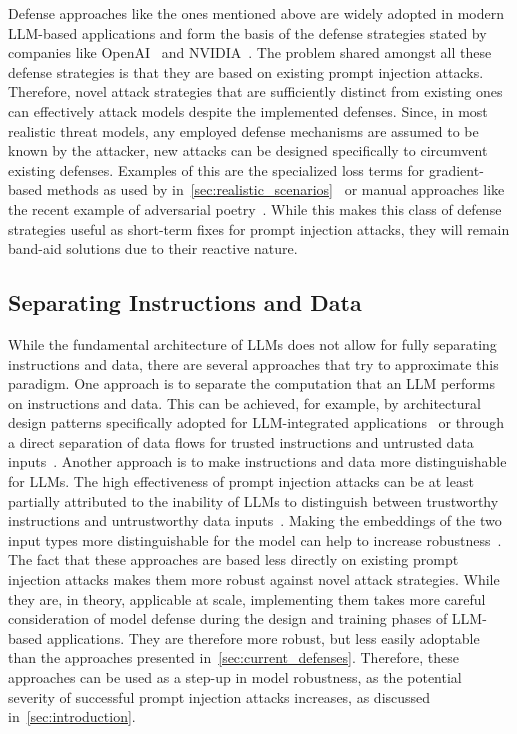 Defense approaches like the ones mentioned above are widely adopted in modern LLM-based applications and form the basis of the defense strategies stated by companies like OpenAI~\cite{openai_understanding_nodate} and NVIDIA~\cite{atefehasayesh_securing_2023}.
The problem shared amongst all these defense strategies is that they are based on existing prompt injection attacks.
Therefore, novel attack strategies that are sufficiently distinct from existing ones can effectively attack models despite the implemented defenses.
Since, in most realistic threat models, any employed defense mechanisms are assumed to be known by the attacker, new attacks can be designed specifically to circumvent existing defenses.
Examples of this are the specialized loss terms for gradient-based methods as used by \shi in~\cref{sec:realistic_scenarios}~\cite{shi_optimization-based_2024} or manual approaches like the recent example of adversarial poetry~\cite{bisconti_adversarial_2025}.
While this makes this class of defense strategies useful as short-term fixes for prompt injection attacks, they will remain band-aid solutions due to their reactive nature.

\subsection{Separating Instructions and Data}
While the fundamental architecture of LLMs does not allow for fully separating instructions and data, there are several approaches that try to approximate this paradigm.
One approach is to separate the computation that an LLM performs on instructions and data.
This can be achieved, for example, by architectural design patterns specifically adopted for LLM-integrated applications~\cite{beurer-kellner_design_2025} or through a direct separation of data flows for trusted instructions and untrusted data inputs~\cite{debenedetti_defeating_2025}.
Another approach is to make instructions and data more distinguishable for LLMs.
The high effectiveness of prompt injection attacks can be at least partially attributed to the inability of LLMs to distinguish between trustworthy instructions and untrustworthy data inputs~\cite{zverev_can_2024}.
Making the embeddings of the two input types more distinguishable for the model can help to increase robustness~\cite{zverev_aside_2025}.\\

The fact that these approaches are based less directly on existing prompt injection attacks makes them more robust against novel attack strategies.
While they are, in theory, applicable at scale, implementing them takes more careful consideration of model defense during the design and training phases of LLM-based applications.
They are therefore more robust, but less easily adoptable than the approaches presented in~\cref{sec:current_defenses}.
Therefore, these approaches can be used as a step-up in model robustness, as the potential severity of successful prompt injection attacks increases, as discussed in~\cref{sec:introduction}.

